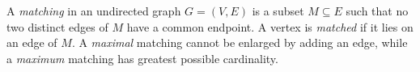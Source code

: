 
A \emph{matching} in an undirected graph $G=(V,E)$ is a subset $M\subseteq E$ such that no two distinct edges of $M$ have a common endpoint. A vertex is \emph{matched} if it lies on an edge of $M$. A \emph{maximal} matching cannot be enlarged by adding an edge, while a \emph{maximum} matching has greatest possible cardinality.
